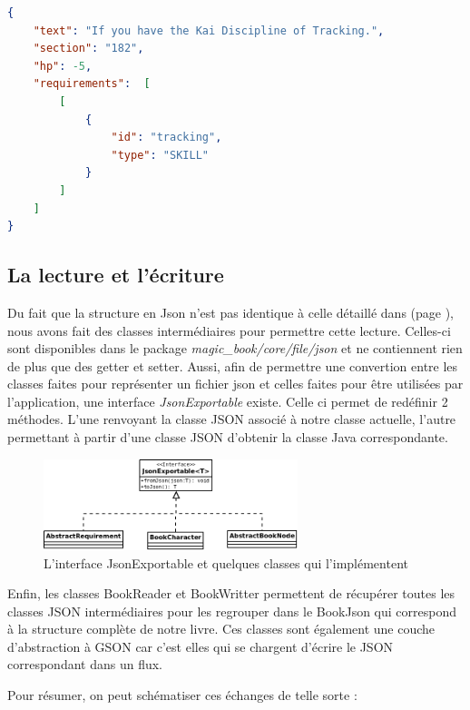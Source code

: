 \begin{lstlisting}[language=json, caption=Exemple de choix]
{
	"text": "If you have the Kai Discipline of Tracking.",
	"section": "182",
	"hp": -5,
	"requirements":  [
		[
			{
				"id": "tracking",
				"type": "SKILL"
			}
		]
	]
}
\end{lstlisting}

		\subsection{La lecture et l'écriture}

			Du fait que la structure en Json n'est pas identique à celle détaillé dans  (page \pageref{sec:representation_livre}), nous avons fait des classes intermédiaires pour permettre cette lecture. Celles-ci sont disponibles dans le package \textit{magic\_book/core/file/json} et ne contiennent rien de plus que des getter et setter. Aussi, afin de permettre une convertion entre les classes faites pour représenter un fichier json et celles faites pour être utilisées par l'application, une interface \textit{JsonExportable} existe. Celle ci permet de redéfinir 2 méthodes. L'une renvoyant la classe JSON associé à notre classe actuelle, l'autre permettant à partir d'une classe JSON d'obtenir la classe Java correspondante.

			\begin{figure}[H]
				\centering\includegraphics[width=0.66\textwidth, keepaspectratio]{img/json_exportable.png}
				\caption{L'interface JsonExportable et quelques classes qui l'implémentent}
			\end{figure}

			Enfin, les classes BookReader et BookWritter permettent de récupérer toutes les classes JSON intermédiaires pour les regrouper dans le BookJson qui correspond à la structure complète de notre livre. Ces classes sont également une couche d'abstraction à GSON car c'est elles qui se chargent d'écrire le JSON correspondant dans un flux.

			Pour résumer, on peut schématiser ces échanges de telle sorte :

